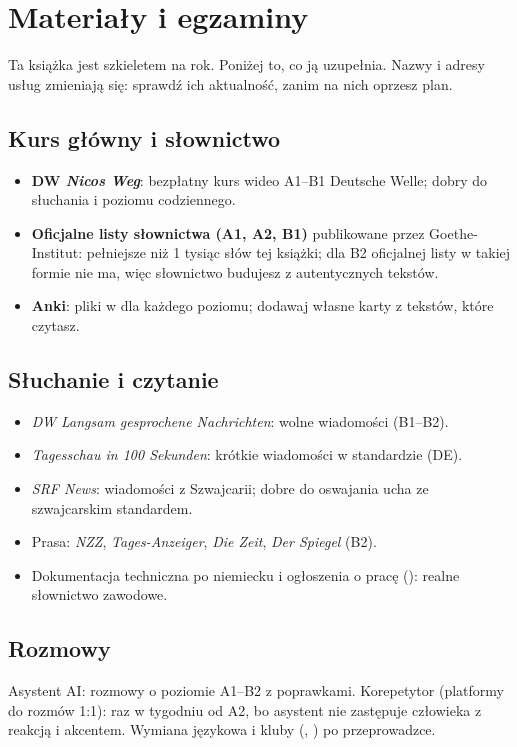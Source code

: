 \chapter{Materiały i egzaminy}
Ta książka jest szkieletem na rok. Poniżej to, co ją uzupełnia. Nazwy i adresy usług zmieniają się: sprawdź ich aktualność, zanim na nich
oprzesz plan.

\section*{Kurs główny i słownictwo}
\begin{itemize}
\item \textbf{DW \emph{Nicos Weg}}: bezpłatny kurs wideo A1--B1 Deutsche Welle; dobry do słuchania i poziomu codziennego.
\item \textbf{Oficjalne listy słownictwa (A1, A2, B1)} publikowane przez Goethe-Institut: pełniejsze niż 1 tysiąc słów tej książki; dla B2
oficjalnej listy w takiej formie nie ma, więc słownictwo budujesz z autentycznych tekstów.
\item \textbf{Anki}: pliki w  dla każdego poziomu; dodawaj własne karty z tekstów, które czytasz.
\end{itemize}

\section*{Słuchanie i czytanie}
\begin{itemize}
\item \emph{DW Langsam gesprochene Nachrichten}: wolne wiadomości (B1--B2).
\item \emph{Tagesschau in 100 Sekunden}: krótkie wiadomości w standardzie (DE).
\item \emph{SRF News}: wiadomości z Szwajcarii; dobre do oswajania ucha ze szwajcarskim standardem.
\item Prasa: \emph{NZZ}, \emph{Tages-Anzeiger}, \emph{Die Zeit}, \emph{Der Spiegel} (B2).
\item Dokumentacja techniczna po niemiecku i ogłoszenia o pracę (): realne słownictwo zawodowe.
\end{itemize}

\section*{Rozmowy}
Asystent AI: rozmowy o poziomie A1--B2 z poprawkami. Korepetytor (platformy do rozmów 1:1): raz w tygodniu od A2, bo asystent nie zastępuje
człowieka z reakcją i akcentem. Wymiana językowa i kluby (, ) po przeprowadzce.

